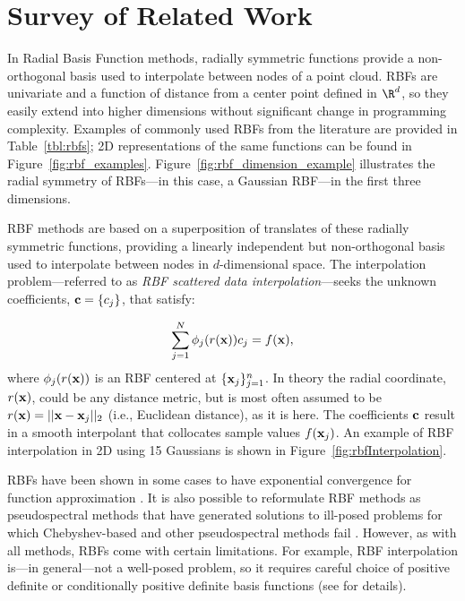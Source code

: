 \documentclass[11pt]{report}
\begin{document}
{\section{Survey of Related Work}

In Radial Basis Function methods, radially symmetric functions provide a non-orthogonal basis used to interpolate between 
nodes of a point cloud. RBFs are univariate and a function of distance from a center point defined in $\R^d$, so 
they easily extend into higher dimensions without significant change in programming complexity. Examples of commonly used RBFs from the literature are provided in Table~\ref{tbl:rbfs}; 2D representations of the same functions can be found in Figure~\ref{fig:rbf_examples}. 
Figure~\ref{fig:rbf_dimension_example} illustrates the radial symmetry of RBFs---in this case, a Gaussian RBF---in the first three dimensions. 

RBF methods are based on a superposition of translates of these radially symmetric functions, providing a linearly independent but non-orthogonal basis used to interpolate between nodes in $d$-dimensional space. The interpolation problem---referred to as \emph{RBF scattered data interpolation}---seeks the unknown coefficients, $\mathbf{c} = \{c_j\}$, that satisfy: 
 
\begin{eqnarray*}
    \sum_{j=1}^{N} \phi_j(r(\mathbf{x})) c_{j}   = f(\mathbf{x}),
\end{eqnarray*}
where $\phi_j(r(\mathbf{x}))$ is an RBF centered at $\{\mathbf{x}_j\}_{j=1}^{n}$. In theory the radial coordinate, $r(\mathbf{x})$, could be any distance metric, but is most often assumed to be $r(\mathbf{x}) = ||\mathbf{x}-\mathbf{x}_j||_2$ (i.e., Euclidean distance), as it is here. The coefficients $\mathbf{c}$ result in a smooth interpolant that collocates sample values $f(\mathbf{x}_j)$. An example of RBF interpolation in 2D using 15 Gaussians is shown in Figure~\ref{fig:rbfInterpolation}. 



RBFs have been shown in 
some cases to have exponential convergence for function approximation \cite{Fasshauer2007}. It is also possible to 
reformulate RBF methods as pseudospectral methods that have 
generated solutions to ill-posed problems for which Chebyshev-based and other pseudospectral methods 
fail \cite{Fasshauer2006}. However, as with all methods, RBFs come with certain limitations. For example, RBF interpolation is---in general---not a well-posed problem, so it requires careful choice of positive definite or conditionally positive definite basis functions (see \cite{Iske2004, Fasshauer2007} for details). 

}
\end{document}
